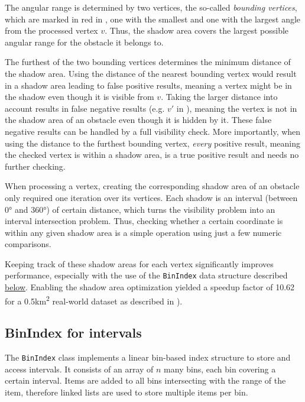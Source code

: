 		The angular range is determined by two vertices, the so-called \emph{bounding vertices}, which are marked in red in , one with the smallest and one with the largest angle from the processed vertex $v$.
		Thus, the shadow area covers the largest possible angular range for the obstacle it belongs to.
		
		The furthest of the two bounding vertices determines the minimum distance of the shadow area.
		Using the distance of the nearest bounding vertex would result in a shadow area leading to false positive results, meaning a vertex might be in the shadow even though it is visible from $v$.
		Taking the larger distance into account results in false negative results (e.g. $v'$ in ), meaning the vertex is not in the shadow area of an obstacle even though it is hidden by it.
		These false negative results can be handled by a full visibility check.
		More importantly, when using the distance to the furthest bounding vertex, \emph{every} positive result, meaning the checked vertex is within a shadow area, is a true positive result and needs no further checking.
		
		When processing a vertex, creating the corresponding shadow area of an obstacle only required one iteration over its vertices.
		Each shadow is an interval (between 0° and 360°) of certain distance, which turns the visibility problem into an interval intersection problem.
		Thus, checking whether a certain coordinate is within any given shadow area is a simple operation using just a few numeric comparisons.
		
		Keeping track of these shadow areas for each vertex significantly improves performance, especially with the use of the \texttt{BinIndex} data structure described \hyperref[subsec:binindex]{below}.
		Enabling the shadow area optimization yielded a speedup factor of 10.62 for a 0.5km\textsuperscript{2} real-world dataset as described in ).

	\subsection{BinIndex for intervals}
	\label{subsec:binindex}
	
		The \texttt{BinIndex} class implements a linear bin-based index structure to store and access intervals.
		It consists of an array of $n$ many bins, each bin covering a certain interval.
		Items are added to all bins intersecting with the range of the item, therefore linked lists are used to store multiple items per bin.
	
